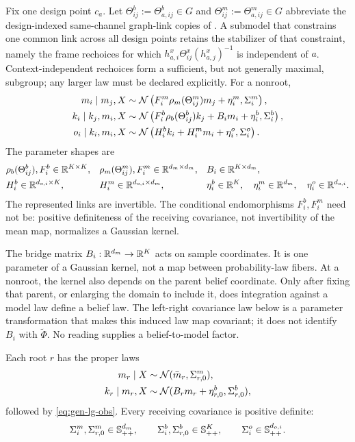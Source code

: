 Fix one design point \(c_a\). Let
\(\Theta_{ij}^b:=\Theta_{a,ij}^b\in G\) and
\(\Theta_{ij}^m:=\Theta_{a,ij}^m\in G\) abbreviate the design-indexed
same-channel graph-link copies of . A submodel
that constrains one common link across all design points retains the
stabilizer of that constraint, namely the frame rechoices for which
\(h_{a,i}^x\Theta_{ij}^x(h_{a,j}^x)^{-1}\) is independent of \(a\).
Context-independent rechoices form a sufficient, but not generally maximal,
subgroup; any larger law must be declared explicitly. For a nonroot,
\begin{align}
m_i\mid m_j,X
&\sim\mathcal N\left(
F_i^m\rho_m(\Theta_{ij}^m)m_j+\eta_i^m,
\Sigma_i^m\right),
\label{eq:gen-lg-model}\\
k_i\mid k_j,m_i,X
&\sim\mathcal N\left(
F_i^b\rho_b(\Theta_{ij}^b)k_j+B_im_i+\eta_i^b,
\Sigma_i^b\right),
\label{eq:gen-lg-state}\\
o_i\mid k_i,m_i,X
&\sim\mathcal N\left(
H_i^bk_i+H_i^mm_i+\eta_i^o,
\Sigma_i^o\right).
\label{eq:gen-lg-obs}
\end{align}
The parameter shapes are
\begin{align}
&\rho_b(\Theta_{ij}^b),F_i^b\in\mathbb R^{K\times K},
&&\rho_m(\Theta_{ij}^m),F_i^m\in\mathbb R^{d_m\times d_m},
&&B_i\in\mathbb R^{K\times d_m},
\label{eq:gen-lg-shapes-latent}\\
&H_i^b\in\mathbb R^{d_{o,i}\times K},
&&H_i^m\in\mathbb R^{d_{o,i}\times d_m},
&&\eta_i^b\in\mathbb R^K,
\quad
\eta_i^m\in\mathbb R^{d_m},
\quad
\eta_i^o\in\mathbb R^{d_{o,i}}.
\label{eq:gen-lg-shapes-obs}
\end{align}
The represented links are invertible.  The conditional endomorphisms $F_i^b,F_i^m$ need not be:
positive definiteness of the receiving covariance, not invertibility of the mean map, normalizes a
Gaussian kernel.

The bridge matrix $B_i:\mathbb R^{d_m}\to\mathbb R^K$ acts on sample coordinates.  It is one parameter of a
Gaussian kernel, not a map between probability-law fibers.  At a nonroot, the kernel also depends
on the parent belief coordinate.  Only after fixing that parent, or enlarging the domain to include
it, does integration against a model law define a belief law.  The left-right covariance law below
is a parameter transformation that makes this induced law map covariant; it does not identify
$B_i$ with $\widetilde\Phi$.  No reading supplies a belief-to-model factor.

Each root $r$ has the proper laws
\begin{align}
m_r\mid X
&\sim\mathcal N(\bar m_r,\Sigma_{r,0}^m),
\label{eq:gen-lg-root-model}\\
k_r\mid m_r,X
&\sim\mathcal N(B_rm_r+\eta_{r,0}^b,\Sigma_{r,0}^b),
\label{eq:gen-lg-root-state}
\end{align}
followed by \eqref{eq:gen-lg-obs}.  Every receiving covariance is positive definite:
\begin{equation}
\Sigma_i^m,\Sigma_{r,0}^m\in\mathbb S_{++}^{d_m},
\qquad
\Sigma_i^b,\Sigma_{r,0}^b\in\mathbb S_{++}^{K},
\qquad
\Sigma_i^o\in\mathbb S_{++}^{d_{o,i}}.
\label{eq:gen-lg-spd}
\end{equation}
\label{hyp:gen-lg-spd}

